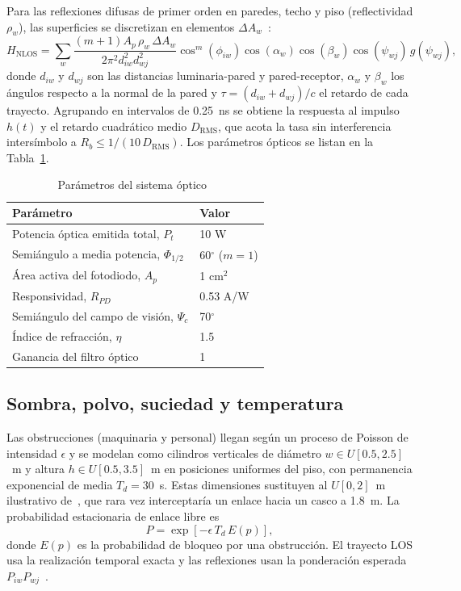 \documentclass[conference]{IEEEtran}
\begin{document}
Para las reflexiones difusas de primer orden en paredes, techo y piso (reflectividad $\rho_w$), las superficies se discretizan en elementos $\Delta A_w$~\cite{palacios2020,kahn1997}:
\begin{equation}
H_{\mathrm{NLOS}}=\sum_{w}\frac{(m+1)A_p\,\rho_w\,\Delta A_w}{2\pi^{2}d_{iw}^{2}d_{wj}^{2}}\cos^{m}(\phi_{iw})\cos(\alpha_w)\cos(\beta_w)\cos(\psi_{wj})\,g(\psi_{wj}),
\label{eq:nlos}
\end{equation}
donde $d_{iw}$ y $d_{wj}$ son las distancias luminaria-pared y pared-receptor, $\alpha_w$ y $\beta_w$ los ángulos respecto a la normal de la pared y $\tau=(d_{iw}+d_{wj})/c$ el retardo de cada trayecto. Agrupando en intervalos de 0.25~ns se obtiene la respuesta al impulso $h(t)$ y el retardo cuadrático medio $D_{\mathrm{RMS}}$, que acota la tasa sin interferencia intersímbolo a $R_b\le 1/(10\,D_{\mathrm{RMS}})$. Los parámetros ópticos se listan en la Tabla~\ref{tab:param}.

\begin{table}[!t]
\caption{Parámetros del sistema óptico~\cite{palacios2020}}
\label{tab:param}
\centering
\begin{tabular}{ll}
\toprule
\textbf{Parámetro} & \textbf{Valor}\\
\midrule
Potencia óptica emitida total, $P_t$ & 10 W \\
Semiángulo a media potencia, $\Phi_{1/2}$ & 60$^{\circ}$ ($m=1$) \\
Área activa del fotodiodo, $A_p$ & 1 cm$^{2}$ \\
Responsividad, $R_{PD}$ & 0.53 A/W \\
Semiángulo del campo de visión, $\Psi_c$ & 70$^{\circ}$ \\
Índice de refracción, $\eta$ & 1.5 \\
Ganancia del filtro óptico & 1 \\
\bottomrule
\end{tabular}
\end{table}

\subsection{Sombra, polvo, suciedad y temperatura}
Las obstrucciones (maquinaria y personal) llegan según un proceso de Poisson de intensidad $\epsilon$ y se modelan como cilindros verticales de diámetro $w\in U[0.5, 2.5]$~m y altura $h\in U[0.5, 3.5]$~m en posiciones uniformes del piso, con permanencia exponencial de media $T_d=30$~s. Estas dimensiones sustituyen al $U[0,2]$~m ilustrativo de~\cite{palacios2020}, que rara vez interceptaría un enlace hacia un casco a 1.8~m. La probabilidad estacionaria de enlace libre es
\begin{equation}
P=\exp\!\left[-\epsilon\,T_d\,E(p)\right],
\label{eq:sombra}
\end{equation}
donde $E(p)$ es la probabilidad de bloqueo por una obstrucción. El trayecto LOS usa la realización temporal exacta y las reflexiones usan la ponderación esperada $P_{iw}P_{wj}$~\cite{palacios2020}.
\end{document}
